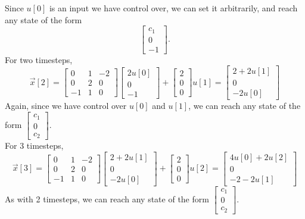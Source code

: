 \begin{enumerate}
{        Since $u[0]$ is an input we have control over, we can set it arbitrarily, and reach any state of the form 
        \[ \begin{bmatrix} c_1 \\ 0 \\ -1\end{bmatrix}. \]
        For two timesteps,
        \[\vec{x}[2] = 
        \begin{bmatrix}
            0 & 1 & -2 \\
            0 & 2 & 0 \\
            -1 & 1 & 0
        \end{bmatrix} 
        \begin{bmatrix} 
            2u[0] \\ 0 \\ -1
        \end{bmatrix}
        + \begin{bmatrix}
            2 \\ 0 \\ 0
        \end{bmatrix} u[1] = 
        \begin{bmatrix} 
            2 + 2u[1] \\ 0 \\ -2u[0]
        \end{bmatrix}\]
        Again, since we have control over $u[0]$ and $u[1]$, we can reach any state of the form $\begin{bmatrix} c_1 \\ 0 \\ c_2 \end{bmatrix}$. \\
        \newline
        For 3 timesteps,
        \[\vec{x}[3] = 
        \begin{bmatrix}
            0 & 1 & -2 \\
            0 & 2 & 0 \\
            -1 & 1 & 0
        \end{bmatrix} 
        \begin{bmatrix} 
            2 + 2u[1] \\ 0 \\ -2u[0]
        \end{bmatrix}
        + \begin{bmatrix}
            2 \\ 0 \\ 0
        \end{bmatrix} u[2] = 
        \begin{bmatrix} 
            4u[0] + 2u[2] \\ 0 \\ -2 - 2u[1]
        \end{bmatrix}\]
        As with 2 timesteps, we can reach any state of the form $\begin{bmatrix} c_1 \\ 0 \\ c_2 \end{bmatrix}$.
    }


\end{enumerate}
